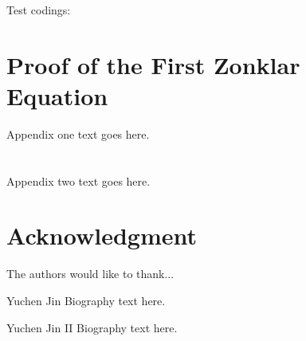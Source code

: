 \documentclass[mainfont=Palatino,color]{IEEERev} %
\begin{document}
Test codings:



\appendices
\section{Proof of the First Zonklar Equation}
Appendix one text goes here.

\section{}
Appendix two text goes here.

\section*{Acknowledgment}

The authors would like to thank...

\ifCLASSOPTIONcaptionsoff
  \newpage
\fi




\begin{IEEEbiography}{Yuchen Jin}
  Biography text here.
\end{IEEEbiography}

\begin{IEEEbiography}{Yuchen Jin II}
  Biography text here.
\end{IEEEbiography}
\end{document}
